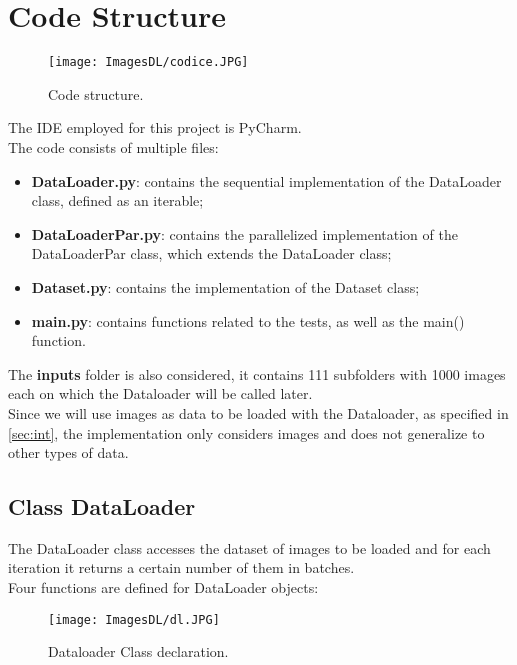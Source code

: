 \documentclass[10pt,twocolumn,letterpaper]{article}
\newcommand{\bit} {\begin{itemize} }
\newcommand{\eit} {\end{itemize} }
\begin{document}
\section{Code Structure}

\begin{figure}[h]
    \centering
    \texttt{[image: ImagesDL/codice.JPG]}
    \caption{Code structure.}
    \label{fig:cod}
\end{figure}

The IDE employed for this project is PyCharm.\\
The code consists of multiple files:

\bit
    \item{\textbf{DataLoader.py}: contains the sequential implementation of the DataLoader class, defined as an iterable;}
    \item{\textbf{DataLoaderPar.py}: contains the parallelized implementation of the DataLoaderPar class, which extends the DataLoader class;}
    \item{\textbf{Dataset.py}: contains the implementation of the Dataset class;}
    \item{\textbf{main.py}: contains functions related to the tests, as well as the main() function.}
\eit

The \textbf{inputs} folder is also considered, it contains 111 subfolders with 1000 images each on which the Dataloader will be called later.\\
Since we will use images as data to be loaded with the Dataloader, as specified in \cref{sec:int}, the implementation only considers images and does not generalize to other types of data.

\subsection{Class DataLoader}
The DataLoader class accesses the dataset of images to be loaded and for each iteration it returns a certain number of them in batches.\\
Four functions are defined for DataLoader objects:

\begin{figure}[h]
    \centering
    \texttt{[image: ImagesDL/dl.JPG]}
    \caption{Dataloader Class declaration.}
    \label{fig:dl}
\end{figure}
\end{document}
